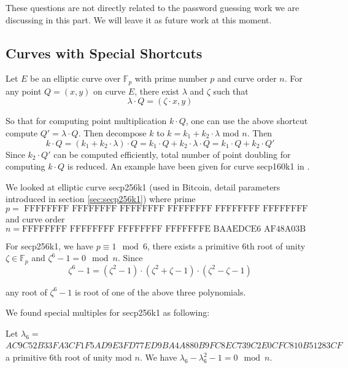 These questions are not directly related to the password guessing work we are discussing in this part. We will leave it as future work at this moment. 
 
\subsection{Curves with Special Shortcuts} \label {sec:shortcuts}

Let $E$ be an elliptic curve over $\mathbb{F}_p$ with prime number $p$ and curve order $n$. For any point $Q=(x,y)$ on curve $E$, there exist $\lambda$ and $\zeta$ such that $$\lambda \cdot Q = (\zeta \cdot x , y)$$

So that for computing point multiplication $k \cdot Q$, one can use the above shortcut compute $Q' = \lambda \cdot Q$. Then decompose $k$ to $k=k_1+k_2 \cdot \lambda$ mod $n$. Then $$k \cdot Q = (k_1 + k_2 \cdot \lambda)\cdot Q = k_1\cdot Q + k_2\cdot \lambda \cdot Q = k_1 \cdot Q + k_2 \cdot Q' $$ Since $k_2 \cdot Q'$ can be computed efficiently, total number of point doubling for computing $k\cdot Q$ is reduced. An example have been given for curve secp160k1 in \cite{hankerson2006guide}.

We looked at elliptic curve secp256k1 (used in Bitcoin, detail parameters introduced in section \ref{sec:secp256k1})  where prime $$p= \text{ FFFFFFFF FFFFFFFF FFFFFFFF FFFFFFFF FFFFFFFF FFFFFFFF FFFFFFFE FFFFFC2F}$$ and curve order $$ n = \text{FFFFFFFF FFFFFFFF FFFFFFFF FFFFFFFE BAAEDCE6 AF48A03B BFD25E8C D0364141}$$



For secp256k1, we have $p \equiv 1 \mod{6}$, there exists a primitive 6th root of unity $\zeta \in \mathbb{F}_p$ and  $\zeta^6 - 1 = 0 \mod{n}$. Since $$\zeta^6 - 1 = (\zeta^2-1)\cdot(\zeta^2+\zeta - 1)\cdot (\zeta^2-\zeta -1)$$ 

any root of $\zeta^6-1$ is root of one of the above three polynomials. 

We found special multiples for secp256k1 as following: 

Let
$\lambda_6 =$\\
$AC9C52B33FA3CF1F5AD9E3FD77ED9BA4A880B9FC8EC739C2E0CFC810B51283CF$
a primitive 6th root of unity mod $n$.
We have $\lambda_6-\lambda_6^2-1=0 \mod{n}$.
%
%

